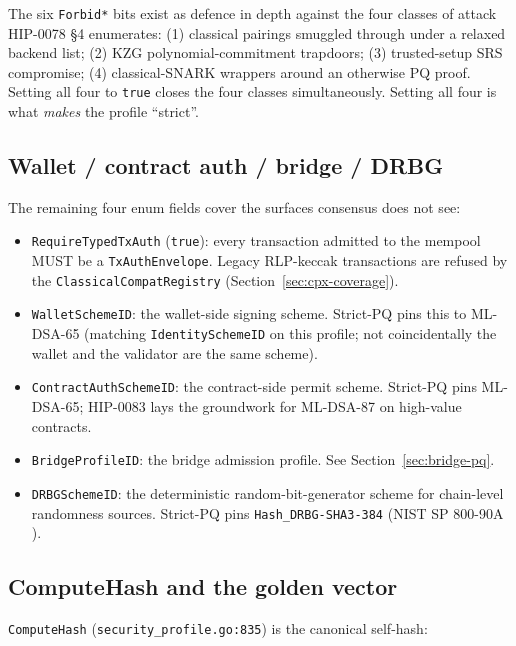 The six \texttt{Forbid*} bits exist as defence in depth against the four
classes of attack HIP-0078 §4 enumerates: (1) classical pairings smuggled
through under a relaxed backend list; (2) KZG polynomial-commitment trapdoors;
(3) trusted-setup SRS compromise; (4) classical-SNARK wrappers around an
otherwise PQ proof. Setting all four to \texttt{true} closes the four classes
simultaneously. Setting all four is what \emph{makes} the profile
``strict''.

\subsection{Wallet / contract auth / bridge / DRBG}

The remaining four enum fields cover the surfaces consensus does not see:

\begin{itemize}[leftmargin=2em,nosep]
  \item \texttt{RequireTypedTxAuth} (\texttt{true}): every transaction
    admitted to the mempool MUST be a \texttt{TxAuthEnvelope}. Legacy
    RLP-keccak transactions are refused by the
    \texttt{ClassicalCompatRegistry} (Section~\ref{sec:cpx-coverage}).
  \item \texttt{WalletSchemeID}: the wallet-side signing scheme. Strict-PQ
    pins this to ML-DSA-65 (matching \texttt{IdentitySchemeID} on this
    profile; not coincidentally the wallet and the validator are the same
    scheme).
  \item \texttt{ContractAuthSchemeID}: the contract-side permit scheme.
    Strict-PQ pins ML-DSA-65; HIP-0083 lays the groundwork for ML-DSA-87
    on high-value contracts.
  \item \texttt{BridgeProfileID}: the bridge admission profile. See
    Section~\ref{sec:bridge-pq}.
  \item \texttt{DRBGSchemeID}: the deterministic random-bit-generator
    scheme for chain-level randomness sources. Strict-PQ pins
    \texttt{Hash\_DRBG-SHA3-384} (NIST SP 800-90A
    \cite{sp80090a}).
\end{itemize}

\subsection{ComputeHash and the golden vector}

\texttt{ComputeHash} (\texttt{security\_profile.go:835}) is the canonical
self-hash:

